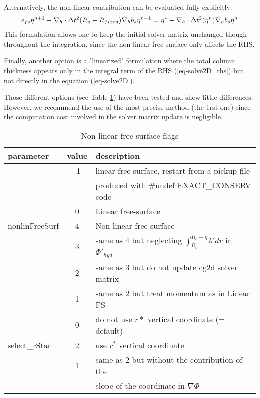 Alternatively, the non-linear contribution can be evaluated fully
explicitly:
\begin{eqnarray*}
\epsilon_{fs} {\eta}^{n+1} -
{\bf \nabla}_h \cdot \Delta t^2 (R_o-R_{fixed})
{\bf \nabla}_h b_s {\eta}^{n+1}
= {\eta}^*
+{\bf \nabla}_h \cdot \Delta t^2 (\eta^{n})
{\bf \nabla}_h b_s {\eta}^{n}
\end{eqnarray*}
This formulation allows one to keep the initial solver matrix
unchanged though throughout the integration, since the non-linear free
surface only affects the RHS.

Finally, another option is a "linearized" formulation where the total
column thickness appears only in the integral term of the RHS
(\ref{eq-solve2D_rhs}) but not directly in the equation
(\ref{eq-solve2D}).

Those different options (see Table \ref{tab:nonLinFreeSurf_flags})
have been tested and show little differences. However, we recommend
the use of the most precise method (the 1rst one) since the
computation cost involved in the solver matrix update is negligible.

\begin{table}[htb]
\centering
 \begin{tabular}[htb]{|l|c|l|}
   \hline
   parameter & value & description \\
   \hline
                   & -1 & linear free-surface, restart from a pickup file \\
                   &    & produced with \#undef EXACT\_CONSERV code\\
   \cline{2-3}
                   & 0 & Linear free-surface \\
   \cline{2-3}
    nonlinFreeSurf & 4 & Non-linear free-surface \\
   \cline{2-3}
                   & 3 & same as 4 but neglecting
                           $\int_{R_o}^{R_o+\eta} b' dr $ in $\Phi'_{hyd}$ \\
   \cline{2-3}
                   & 2 & same as 3 but do not update cg2d solver matrix \\
   \cline{2-3}
                  & 1 & same as 2 but treat momentum as in Linear FS \\
   \hline
                  & 0 & do not use $r*$ vertical coordinate (= default)\\
   \cline{2-3}
    select\_rStar & 2 & use $r^*$ vertical coordinate \\
   \cline{2-3}
                  & 1 & same as 2 but without the contribution of the\\
                  &   & slope of the coordinate in $\nabla \Phi$ \\
   \hline
  \end{tabular}
  \caption{Non-linear free-surface flags}
  \label{tab:nonLinFreeSurf_flags}
\end{table}



